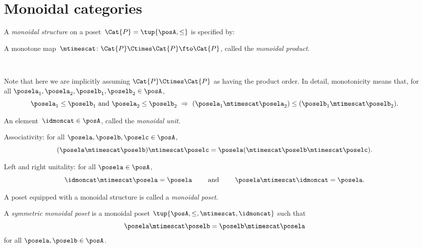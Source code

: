 

\section{Monoidal categories}
\label{sec:parallelism-mon-cat}

\begin{ctdefinition}
  \label{def:monoidal_poset}
  A \emph{monoidal structure} on a poset~$\Cat{P} = \tup{\posA, \leq}$ is specified by:
  
  \constit
  \begin{compactenum}
    \item A monotone map~$\mtimescat \colon \Cat{P} \Ctimes \Cat{P} \fto \Cat{P}$, called the \emph{monoidal product}. 
    
    \
    
    \noindent
    Note that here we are implicitly assuming $\Cat{P} \Ctimes \Cat{P}$ as having the product order. In detail, monotonicity means that, for all $\posela_1, \posela_2, \poselb_1, \poselb_2 \in \posA$, 
        $$
    \posela_1 \leq \poselb_1 \text{ and } \posela_2 \leq \poselb_2 \ \Rightarrow \ (\posela_1 \mtimescat  \posela_2) \leq  (\poselb_1 \mtimescat  \poselb_2).
    $$
    
    \item An element~$\idmoncat \in \posA$, called the \emph{monoidal unit}.
  \end{compactenum}
  
   \condit
    \begin{compactenum}
    \item Associativity: for all $\posela, \poselb, \poselc \in \posA$, 
    $$ (\posela \mtimescat \poselb) \mtimescat \poselc =  \posela ( \mtimescat \poselb \mtimescat \poselc).$$
    \item Left and right unitality: for all $\posela \in \posA$, 
    $$\idmoncat \mtimescat \posela = \posela \quad \quad \text{ and } \quad \quad \posela \mtimescat \idmoncat = \posela.$$
  \end{compactenum}
  
  \noindent A poset equipped with a monoidal structure is called a \emph{monoidal poset}.
\end{ctdefinition}

\begin{ctdefinition}
  \label{def:sym_monoidal_poset}
A \emph{symmetric monoidal poset} is a monoidal poset $\tup{\posA, \leq, \mtimescat, \idmoncat}$ such that
$$
\posela \mtimescat \poselb = \poselb \mtimescat \posela
$$
for all $\posela, \poselb \in \posA$. 
\end{ctdefinition}


